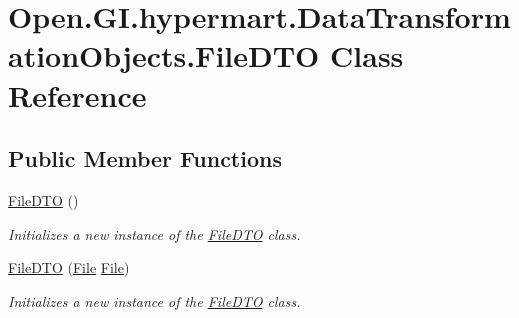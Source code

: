 \hypertarget{class_open_1_1_g_i_1_1hypermart_1_1_data_transformation_objects_1_1_file_d_t_o}{}\section{Open.\+G\+I.\+hypermart.\+Data\+Transformation\+Objects.\+File\+D\+T\+O Class Reference}
\label{class_open_1_1_g_i_1_1hypermart_1_1_data_transformation_objects_1_1_file_d_t_o}


 


\subsection*{Public Member Functions}
\begin{DoxyCompactItemize}
\item 
\hyperlink{class_open_1_1_g_i_1_1hypermart_1_1_data_transformation_objects_1_1_file_d_t_o_ae0da87388dbf076d2aa151cce63c81a8}{File\+D\+T\+O} ()
\begin{DoxyCompactList}\small\item\em Initializes a new instance of the \hyperlink{class_open_1_1_g_i_1_1hypermart_1_1_data_transformation_objects_1_1_file_d_t_o}{File\+D\+T\+O} class. \end{DoxyCompactList}\item 
\hyperlink{class_open_1_1_g_i_1_1hypermart_1_1_data_transformation_objects_1_1_file_d_t_o_add1a3ae47dca46ed24d3d8dda310a3a2}{File\+D\+T\+O} (\hyperlink{class_open_1_1_g_i_1_1hypermart_1_1_models_1_1_file}{File} \hyperlink{class_open_1_1_g_i_1_1hypermart_1_1_models_1_1_file}{File})
\begin{DoxyCompactList}\small\item\em Initializes a new instance of the \hyperlink{class_open_1_1_g_i_1_1hypermart_1_1_data_transformation_objects_1_1_file_d_t_o}{File\+D\+T\+O} class. \end{DoxyCompactList}\end{DoxyCompactItemize}
